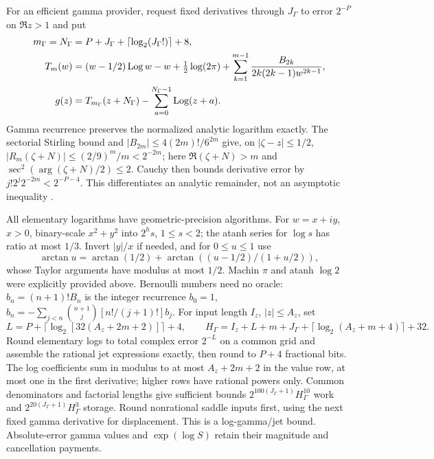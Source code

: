 For an efficient gamma provider, request fixed derivatives through
$J_\Gamma$ to error $2^{-P}$ on $\Re z>1$ and put
\begin{align}
 m_\Gamma=N_\Gamma&=P+J_\Gamma+\lceil\log_2(J_\Gamma!)\rceil+8,\notag\\
 T_m(w)&=(w-1/2)\operatorname{Log} w-w+\tfrac12\log(2\pi)
       +\sum_{k=1}^{m-1}\frac{B_{2k}}{2k(2k-1)w^{2k-1}},\notag\\
 g(z)&=T_{m_\Gamma}(z+N_\Gamma)
                       -\sum_{a=0}^{N_\Gamma-1}\operatorname{Log}(z+a).
 \label{eq:pc-gamma}
\end{align}
Gamma recurrence preserves the normalized analytic logarithm exactly.
The sectorial Stirling bound and
$|B_{2m}|\le4(2m)!/6^{2m}$ give, on $|\zeta-z|\le1/2$,
$|R_m(\zeta+N)|\le(2/9)^m/m<2^{-2m}$; here
$\Re(\zeta+N)>m$ and $\sec^2(\arg(\zeta+N)/2)\le2$.
Cauchy then bounds derivative error by
$j!2^j2^{-2m}<2^{-P-4}$. This differentiates an analytic remainder,
not an asymptotic inequality \cite{DLMFGammaOuter2026,DLMFBernoulli}.

All elementary logarithms have geometric-precision algorithms. For
$w=x+iy$, $x>0$, binary-scale $x^2+y^2$ into $2^hs$, $1\le s<2$;
the atanh series for $\log s$ has ratio at most $1/3$. Invert
$|y|/x$ if needed, and for $0\le u\le1$ use
\[
 \arctan u=\arctan(1/2)
                 +\arctan((u-1/2)/(1+u/2)),
\]
whose Taylor arguments have modulus at most $1/2$. Machin $\pi$
and atanh $\log2$ were explicitly provided above. Bernoulli numbers
need no oracle: $b_n=(n+1)!B_n$ is the integer recurrence
$b_0=1$, $b_n=-\sum_{j<n}\binom{n+1}j[n!/(j+1)!]b_j$.
For input length $I_z$, $|z|\le A_z$, set
\[
 L=P+\lceil\log_2[32(A_z+2m+2)]\rceil+4,\qquad
 H_\Gamma=I_z+L+m+J_\Gamma+\lceil\log_2(A_z+m+4)\rceil+32.
\]
Round elementary logs to total complex error $2^{-L}$ on a common
grid and assemble the rational jet expressions exactly, then round
to $P+4$ fractional bits. The log coefficients sum in modulus to at
most $A_z+2m+2$ in the value row, at most one in the first derivative;
higher rows have rational powers only. Common denominators and factorial
lengths give sufficient bounds
$2^{100(J_\Gamma+1)}H_\Gamma^{10}$ work and
$2^{20(J_\Gamma+1)}H_\Gamma^3$ storage. Round nonrational saddle
inputs first, using the next fixed gamma derivative for displacement.
This is a log-gamma/jet bound. Absolute-error gamma values and
$\exp(\log S)$ retain their magnitude and cancellation payments.

